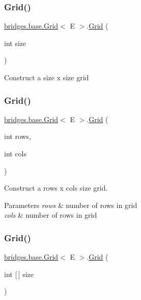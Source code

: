\subsubsection{\texorpdfstring{Grid()}{Grid()}\hspace{0.1cm}{\footnotesize\ttfamily [2/4]}}
{\footnotesize\ttfamily \hyperlink{classbridges_1_1base_1_1_grid}{bridges.\+base.\+Grid}$<$ E $>$.\hyperlink{classbridges_1_1base_1_1_grid}{Grid} (\begin{DoxyParamCaption}\item[{int}]{size }\end{DoxyParamCaption})}

Construct a size x size grid \mbox{\label{classbridges_1_1base_1_1_grid_a43a699bd7ae2c6c986f978c515ff97d8}} 
\subsubsection{\texorpdfstring{Grid()}{Grid()}\hspace{0.1cm}{\footnotesize\ttfamily [3/4]}}
{\footnotesize\ttfamily \hyperlink{classbridges_1_1base_1_1_grid}{bridges.\+base.\+Grid}$<$ E $>$.\hyperlink{classbridges_1_1base_1_1_grid}{Grid} (\begin{DoxyParamCaption}\item[{int}]{rows,  }\item[{int}]{cols }\end{DoxyParamCaption})}



Construct a rows x cols size grid. 


\begin{DoxyParams}{Parameters}
{\em rows} & number of rows in grid \\
\hline
{\em cols} & number of rows in grid \\
\hline
\end{DoxyParams}
\mbox{\label{classbridges_1_1base_1_1_grid_ab9975b28d8dda7f3fbe0e35a7a026772}} 
\subsubsection{\texorpdfstring{Grid()}{Grid()}\hspace{0.1cm}{\footnotesize\ttfamily [4/4]}}
{\footnotesize\ttfamily \hyperlink{classbridges_1_1base_1_1_grid}{bridges.\+base.\+Grid}$<$ E $>$.\hyperlink{classbridges_1_1base_1_1_grid}{Grid} (\begin{DoxyParamCaption}\item[{int \mbox{[}$\,$\mbox{]}}]{size }\end{DoxyParamCaption})}



